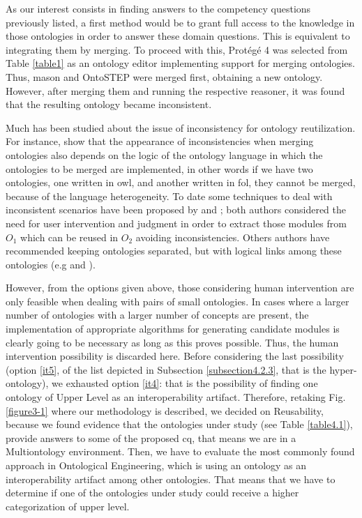 As our interest consists in finding answers to the competency questions previously listed, a first method would be to grant full access to the knowledge in those ontologies in order to answer these domain questions. This is equivalent to integrating them by merging. To proceed with this, Protégé 4 was selected from Table \ref{table1} as an ontology editor implementing support for merging ontologies. Thus, \gls{mason} and OntoSTEP were merged first, obtaining a new ontology. However, after merging them and running the respective reasoner, it was found that the resulting ontology became inconsistent.

Much has been studied about the issue   of inconsistency for ontology reutilization. For instance, \cite{ghilardi_did_2006} show that the appearance of inconsistencies when merging ontologies also depends on the logic of the ontology language in which the ontologies to be merged are implemented, in other words if we have two ontologies, one written in \gls{owl}, and another written in \gls{fol}, they cannot be merged, because of the language heterogeneity. To date some techniques to deal with inconsistent scenarios have been proposed by \cite{grau_owl_2008}  and \cite{xiang_ontofox:_2010}; both authors considered the need for user intervention and judgment in order to extract those modules from  $O_{1}$ which can be reused in $O_{2}$ avoiding inconsistencies. Others  authors have recommended keeping ontologies separated, but with logical links among these ontologies (e.g \cite{bateman_oasis_2009} and \cite{kutz_carnap_2010}). 

However, from the options given above, those considering human intervention are only feasible when dealing with pairs of small ontologies. In cases where a larger number of ontologies with a larger number of concepts are present, the implementation of appropriate algorithms for generating candidate modules is clearly going to be necessary as long as this proves possible.  Thus, the human intervention possibility is discarded here. Before considering the last possibility  (option \ref{it5}, of the list depicted in Subsection \ref{subsection4.2.3}, that is the  hyper-ontology), we exhausted option \ref{it4}: that is the possibility of finding one ontology of Upper Level as an interoperability artifact. Therefore, retaking Fig. \ref{figure3-1} where our methodology is described, we  decided on Reusability, because we found evidence that the ontologies under study (see Table \ref{table4.1}), provide answers to some of the proposed \gls{cq}, that means we are in a Multiontology environment. Then, we have to evaluate the most commonly found approach in Ontological Engineering, which is using an ontology as an interoperability artifact among other ontologies. That means that  we have to determine if one of the ontologies under study could receive  a higher categorization of upper level.   

